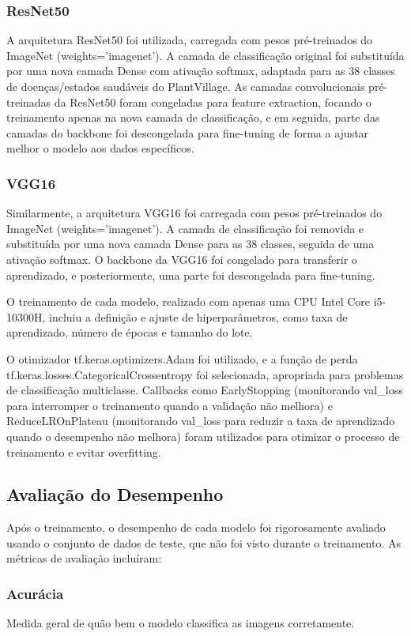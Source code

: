 \documentclass[12pt]{article}
\begin{document}
\subsubsection*{ResNet50}
A arquitetura ResNet50 foi utilizada, carregada com pesos pré-treinados do ImageNet (weights='imagenet'). A camada de classificação original foi substituída por uma nova camada Dense com ativação softmax, adaptada para as 38 classes de doenças/estados saudáveis do PlantVillage. As camadas convolucionais pré-treinadas da ResNet50 foram congeladas para feature extraction, focando o treinamento apenas na nova camada de classificação, e em seguida, parte das camadas do backbone foi descongelada para fine-tuning de forma a ajustar melhor o modelo aos dados específicos.
\subsubsection*{VGG16}
Similarmente, a arquitetura VGG16 foi carregada com pesos pré-treinados do ImageNet (weights='imagenet'). A camada de classificação foi removida e substituída por uma nova camada Dense para as 38 classes, seguida de uma ativação softmax. O backbone da VGG16 foi congelado para transferir o aprendizado, e posteriormente, uma parte foi descongelada para fine-tuning. 

O treinamento de cada modelo, realizado com apenas uma CPU Intel Core i5-10300H, incluiu a definição e ajuste de hiperparâmetros, como taxa de aprendizado, número de épocas e tamanho do lote. 

O otimizador tf.keras.optimizers.Adam foi utilizado, e a função de perda tf.keras.losses.CategoricalCrossentropy foi selecionada, apropriada para problemas de classificação multiclasse. Callbacks como EarlyStopping (monitorando val\_loss para interromper o treinamento quando a validação não melhora) e ReduceLROnPlateau (monitorando val\_loss para reduzir a taxa de aprendizado quando o desempenho não melhora) foram utilizados para otimizar o processo de treinamento e evitar overfitting. 

\subsection{Avaliação do Desempenho}
Após o treinamento, o desempenho de cada modelo foi rigorosamente avaliado usando o conjunto de dados de teste, que não foi visto durante o treinamento. As métricas de avaliação incluíram: 
\subsubsection*{Acurácia}
Medida geral de quão bem o modelo classifica as imagens corretamente.
\end{document}
